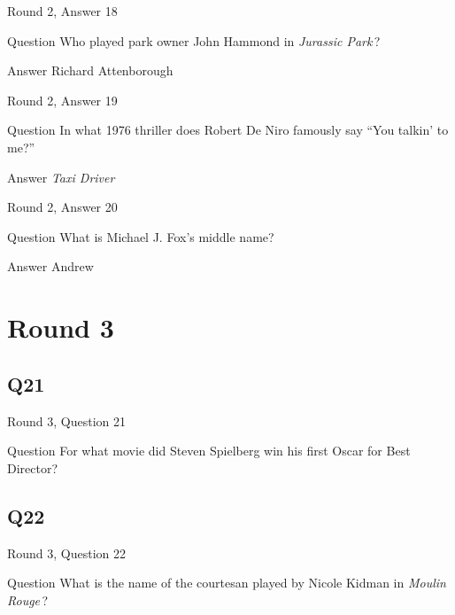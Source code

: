 \documentclass[11pt]{beamer}
\begin{document}
\begin{frame}[t]{Round 2, Answer 18}
\vspace{2em}
\begin{block}{Question}
Who played park owner John Hammond in \emph{Jurassic Park}\,?
\end{block}
\pause{}
\begin{block}{Answer}
Richard Attenborough
\end{block}
\end{frame}
    

\begin{frame}[t]{Round 2, Answer 19}
\vspace{2em}
\begin{block}{Question}
In what 1976 thriller does Robert De Niro famously say ``You talkin' to me?''
\end{block}
\pause{}
\begin{block}{Answer}
\emph{Taxi Driver}
\end{block}
\end{frame}
    

\begin{frame}[t]{Round 2, Answer 20}
\vspace{2em}
\begin{block}{Question}
What is Michael J. Fox's middle name?
\end{block}
\pause{}
\begin{block}{Answer}
Andrew
\end{block}
\end{frame}
    

\section{Round 3}
    

\subsection*{Q21}
\begin{frame}[t]{Round 3, Question 21}
\vspace{2em}
\begin{block}{Question}
For what movie did Steven Spielberg win his first Oscar for Best Director?
\end{block}
\end{frame}
    

\subsection*{Q22}
\begin{frame}[t]{Round 3, Question 22}
\vspace{2em}
\begin{block}{Question}
What is the name of the courtesan played by Nicole Kidman in \emph{Moulin Rouge}\,?
\end{block}
\end{frame}
    
\end{document}
